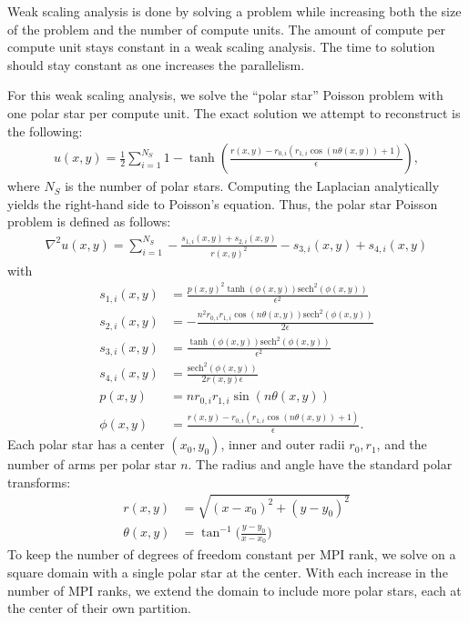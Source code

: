Weak scaling analysis is done by solving a problem while increasing both the size of the problem and the number of compute units. The amount of compute per compute unit stays constant in a weak scaling analysis. The time to solution should stay constant as one increases the parallelism.

For this weak scaling analysis, we solve the ``polar star'' Poisson problem with one polar star per compute unit. The exact solution we attempt to reconstruct is the following:
\begin{align}
    u(x,y) = \frac{1}{2} \sum_{i=1}^{N_{S}} 1 - \tanh \left(\frac{r(x,y)-r_{0,i} \left(r_{1,i} \cos \left(n \theta(x,y)\right)+1\right)}{\epsilon }\right),
\end{align}
where $N_S$ is the number of polar stars. Computing the Laplacian analytically yields the right-hand side to Poisson's equation. Thus, the polar star Poisson problem is defined as follows:
\begin{align}
    \nabla^2 u(x,y) = \sum_{i=1}^{N_{S}} -\frac{s_{1,i}(x,y) + s_{2,i}(x, y)}{r(x,y)^2} - s_{3,i}(x,y) + s_{4,i}(x,y)
\end{align}
with
\begin{align*}
    s_{1,i}(x,y) &= \frac{p(x,y)^2 \tanh \left(\phi(x,y)\right) \text{sech}^2\left(\phi(x,y)\right)}{\epsilon ^2} \\
    s_{2,i}(x,y) &= -\frac{n^2 r_{0,i} r_{1,i} \cos (n \theta(x,y)) \text{sech}^2\left(\phi(x,y)\right)}{2 \epsilon } \\
    s_{3,i}(x,y) &= \frac{\tanh \left(\phi(x,y)\right) \text{sech}^2\left(\phi(x,y)\right)}{\epsilon ^2} \\
    s_{4,i}(x,y) &= \frac{\text{sech}^2\left(\phi(x,y)\right)}{2 r(x,y) \epsilon } \\
    p(x,y) &= n r_{0,i} r_{1,i} \sin (n \theta(x,y)) \\
    \phi(x,y) &= \frac{r(x,y)-r_{0,i} (r_{1,i} \cos (n \theta(x,y))+1)}{\epsilon}.
\end{align*}
Each polar star has a center $(x_0, y_0)$, inner and outer radii $r_0, r_1$, and the number of arms per polar star $n$. The radius and angle have the standard polar transforms:
\begin{align}
    r(x,y) &= \sqrt{(x - x_0)^2 + (y - y_0)^2} \\
    \theta(x,y) &= \tan^{-1}\Big(\frac{y - y_0}{x - x_0}\Big)
\end{align}
To keep the number of degrees of freedom constant per MPI rank, we solve on a square domain with a single polar star at the center. With each increase in the number of MPI ranks, we extend the domain to include more polar stars, each at the center of their own partition.

